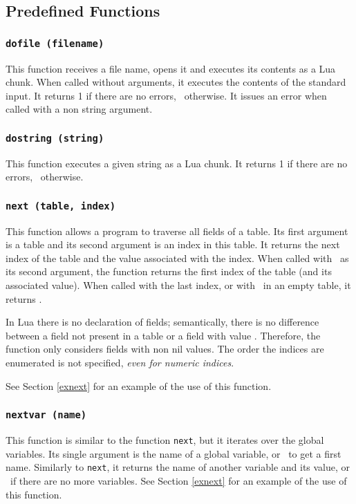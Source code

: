 \subsection{Predefined Functions}

\subsubsection*{{\tt dofile (filename)}}
This function receives a file name,
opens it and executes its contents as a Lua chunk.
When called without arguments,
it executes the contents of the standard input.
It returns 1 if there are no errors, \nil\ otherwise.
It issues an error when called with a non string argument.

\subsubsection*{{\tt dostring (string)}}
This function executes a given string as a Lua chunk.
It returns 1 if there are no errors, \nil\ otherwise.

\subsubsection*{{\tt next (table, index)}}
This function allows a program to traverse all fields of a table.
Its first argument is a table and its second argument
is an index in this table.
It returns the next index of the table and the
value associated with the index.
When called with \nil\ as its second argument,
the function returns the first index
of the table (and its associated value).
When called with the last index, or with \nil\ in an empty table,
it returns \nil.

In Lua there is no declaration of fields;
semantically, there is no difference between a
field not present in a table or a field with value \nil.
Therefore, the function only considers fields with non nil values.
The order the indices are enumerated is not specified,
{\em even for numeric indices}.

See Section \ref{exnext} for an example of the use of this function.

\subsubsection*{{\tt nextvar (name)}}
This function is similar to the function \verb'next',
but it iterates over the global variables.
Its single argument is the name of a global variable,
or \nil\ to get a first name.
Similarly to \verb'next', it returns the name of another variable
and its value,
or \nil\ if there are no more variables.
See Section \ref{exnext} for an example of the use of this function.

